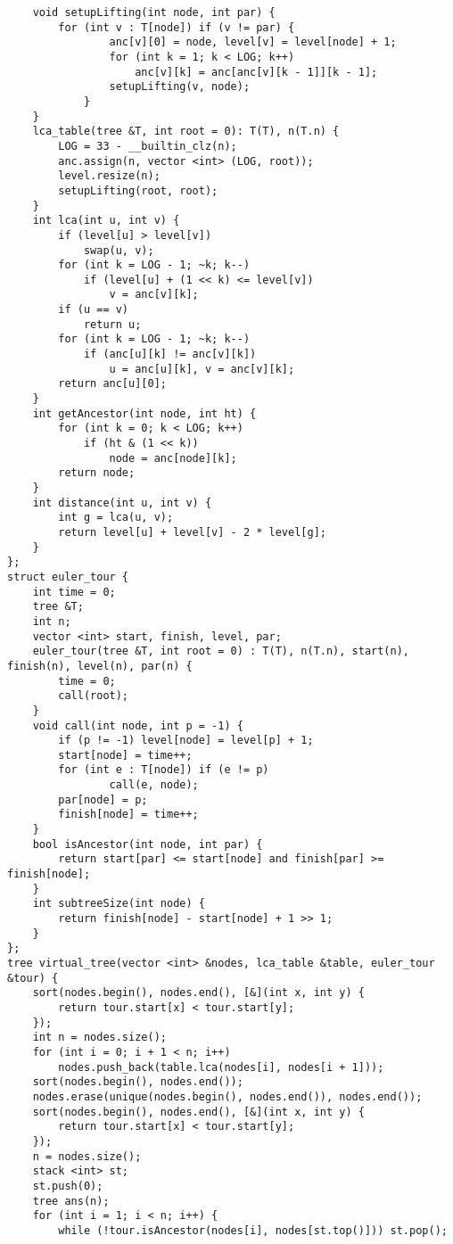 \documentclass[FSZ,a4paper,onesided]{article}
\begin{document}
\begin{multicols*}{\COLS}
\begin{lstlisting}
    void setupLifting(int node, int par) {
        for (int v : T[node]) if (v != par) {
                anc[v][0] = node, level[v] = level[node] + 1;
                for (int k = 1; k < LOG; k++)
                    anc[v][k] = anc[anc[v][k - 1]][k - 1];
                setupLifting(v, node);
            }
    }
    lca_table(tree &T, int root = 0): T(T), n(T.n) {
        LOG = 33 - __builtin_clz(n);
        anc.assign(n, vector <int> (LOG, root));
        level.resize(n);
        setupLifting(root, root);
    }
    int lca(int u, int v) {
        if (level[u] > level[v])
            swap(u, v);
        for (int k = LOG - 1; ~k; k--)
            if (level[u] + (1 << k) <= level[v])
                v = anc[v][k];
        if (u == v)
            return u;
        for (int k = LOG - 1; ~k; k--)
            if (anc[u][k] != anc[v][k])
                u = anc[u][k], v = anc[v][k];
        return anc[u][0];
    }
    int getAncestor(int node, int ht) {
        for (int k = 0; k < LOG; k++)
            if (ht & (1 << k))
                node = anc[node][k];
        return node;
    }
    int distance(int u, int v) {
        int g = lca(u, v);
        return level[u] + level[v] - 2 * level[g];
    }
};
struct euler_tour {
    int time = 0;
    tree &T;
    int n;
    vector <int> start, finish, level, par;
    euler_tour(tree &T, int root = 0) : T(T), n(T.n), start(n), finish(n), level(n), par(n) {
        time = 0;
        call(root);
    }
    void call(int node, int p = -1) {
        if (p != -1) level[node] = level[p] + 1;
        start[node] = time++;
        for (int e : T[node]) if (e != p)
                call(e, node);
        par[node] = p;
        finish[node] = time++;
    }
    bool isAncestor(int node, int par) {
        return start[par] <= start[node] and finish[par] >= finish[node];
    }
    int subtreeSize(int node) {
        return finish[node] - start[node] + 1 >> 1;
    }
};
tree virtual_tree(vector <int> &nodes, lca_table &table, euler_tour &tour) {
    sort(nodes.begin(), nodes.end(), [&](int x, int y) {
        return tour.start[x] < tour.start[y];
    });
    int n = nodes.size();
    for (int i = 0; i + 1 < n; i++)
        nodes.push_back(table.lca(nodes[i], nodes[i + 1]));
    sort(nodes.begin(), nodes.end());
    nodes.erase(unique(nodes.begin(), nodes.end()), nodes.end());
    sort(nodes.begin(), nodes.end(), [&](int x, int y) {
        return tour.start[x] < tour.start[y];
    });
    n = nodes.size();
    stack <int> st;
    st.push(0);
    tree ans(n);
    for (int i = 1; i < n; i++) {
        while (!tour.isAncestor(nodes[i], nodes[st.top()])) st.pop();

\end{lstlisting}
\end{multicols*}
\end{document}
